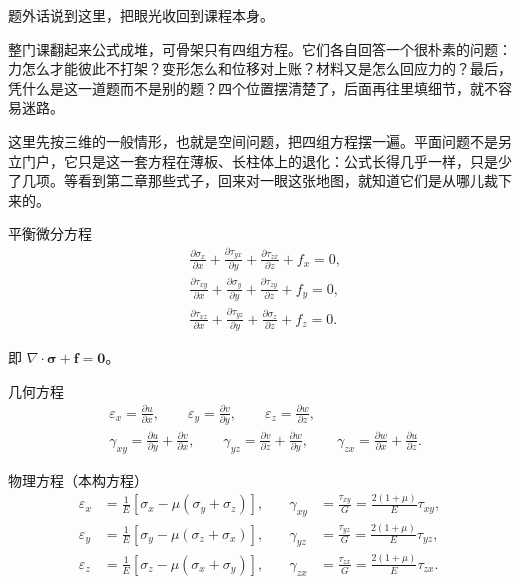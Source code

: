 题外话说到这里，把眼光收回到课程本身。

整门课翻起来公式成堆，可骨架只有四组方程。它们各自回答一个很朴素的问题：力怎么才能彼此不打架？变形怎么和位移对上账？材料又是怎么回应力的？最后，凭什么是这一道题而不是别的题？四个位置摆清楚了，后面再往里填细节，就不容易迷路。

这里先按三维的一般情形，也就是空间问题，把四组方程摆一遍。平面问题不是另立门户，它只是这一套方程在薄板、长柱体上的退化：公式长得几乎一样，只是少了几项。等看到第二章那些式子，回来对一眼这张地图，就知道它们是从哪儿裁下来的。

\begin{myformula}{平衡微分方程}
    \begin{equation}
	\begin{aligned}
		&\frac{\partial\sigma_x}{\partial x}+\frac{\partial\tau_{yx}}{\partial y}+\frac{\partial\tau_{zx}}{\partial z}+f_x=0,\\[2pt]
		&\frac{\partial\tau_{xy}}{\partial x}+\frac{\partial\sigma_y}{\partial y}+\frac{\partial\tau_{zy}}{\partial z}+f_y=0,\\[2pt]
		&\frac{\partial\tau_{xz}}{\partial x}+\frac{\partial\tau_{yz}}{\partial y}+\frac{\partial\sigma_z}{\partial z}+f_z=0.
	\end{aligned}
\end{equation}
\end{myformula}

即 $\nabla\cdot\boldsymbol{\sigma}+\boldsymbol{f}=\boldsymbol{0}$。

\begin{myformula}{几何方程}
\begin{equation}
    \begin{aligned}
		&\varepsilon_x=\frac{\partial u}{\partial x},
		\qquad
		\varepsilon_y=\frac{\partial v}{\partial y},
		\qquad
		\varepsilon_z=\frac{\partial w}{\partial z},\\[4pt]
		&\gamma_{xy}=\frac{\partial u}{\partial y}+\frac{\partial v}{\partial x},
		\qquad
		\gamma_{yz}=\frac{\partial v}{\partial z}+\frac{\partial w}{\partial y},
		\qquad
		\gamma_{zx}=\frac{\partial w}{\partial x}+\frac{\partial u}{\partial z}.
	\end{aligned}
\end{equation}
\end{myformula}


\begin{myformula}{物理方程（本构方程）}
\begin{equation}
	\begin{aligned}
		\varepsilon_x&=\frac{1}{E}\left[\sigma_x-\mu\left(\sigma_y+\sigma_z\right)\right],
		&\quad
		\gamma_{xy}&=\frac{\tau_{xy}}{G}=\frac{2(1+\mu)}{E}\tau_{xy},\\[4pt]
		\varepsilon_y&=\frac{1}{E}\left[\sigma_y-\mu\left(\sigma_z+\sigma_x\right)\right],
		&\quad
		\gamma_{yz}&=\frac{\tau_{yz}}{G}=\frac{2(1+\mu)}{E}\tau_{yz},\\[4pt]
		\varepsilon_z&=\frac{1}{E}\left[\sigma_z-\mu\left(\sigma_x+\sigma_y\right)\right],
		&\quad
		\gamma_{zx}&=\frac{\tau_{zx}}{G}=\frac{2(1+\mu)}{E}\tau_{zx}.
	\end{aligned}
\end{equation}
\end{myformula}

